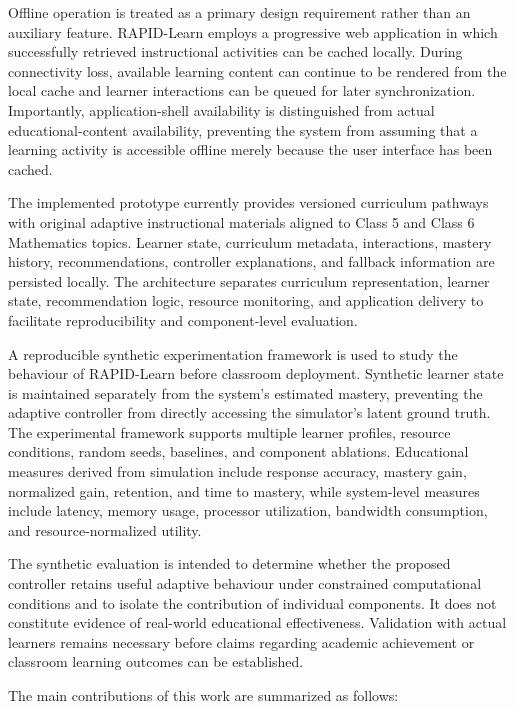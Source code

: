 \documentclass[conference]{IEEEtran}
\begin{document}
Offline operation is treated as a primary design requirement rather than an auxiliary feature. RAPID-Learn employs a progressive web application in which successfully retrieved instructional activities can be cached locally. During connectivity loss, available learning content can continue to be rendered from the local cache and learner interactions can be queued for later synchronization. Importantly, application-shell availability is distinguished from actual educational-content availability, preventing the system from assuming that a learning activity is accessible offline merely because the user interface has been cached.

The implemented prototype currently provides versioned curriculum pathways with original adaptive instructional materials aligned to Class 5 and Class 6 Mathematics topics. Learner state, curriculum metadata, interactions, mastery history, recommendations, controller explanations, and fallback information are persisted locally. The architecture separates curriculum representation, learner state, recommendation logic, resource monitoring, and application delivery to facilitate reproducibility and component-level evaluation.

A reproducible synthetic experimentation framework is used to study the behaviour of RAPID-Learn before classroom deployment. Synthetic learner state is maintained separately from the system's estimated mastery, preventing the adaptive controller from directly accessing the simulator's latent ground truth. The experimental framework supports multiple learner profiles, resource conditions, random seeds, baselines, and component ablations. Educational measures derived from simulation include response accuracy, mastery gain, normalized gain, retention, and time to mastery, while system-level measures include latency, memory usage, processor utilization, bandwidth consumption, and resource-normalized utility.

The synthetic evaluation is intended to determine whether the proposed controller retains useful adaptive behaviour under constrained computational conditions and to isolate the contribution of individual components. It does not constitute evidence of real-world educational effectiveness. Validation with actual learners remains necessary before claims regarding academic achievement or classroom learning outcomes can be established.

The main contributions of this work are summarized as follows:
\end{document}
